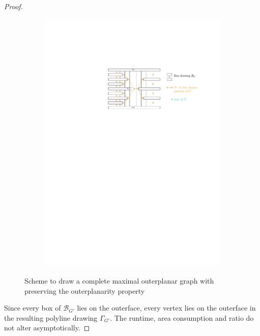 \begin{proof}
\begin{figure}[H]
	\begin{subfigure}{\textwidth}
		\centering
		\includegraphics[page=1,width=\linewidth]{graphics/maximal_outerplanar_preserving_outerplanartiy_scheme.pdf}
	\end{subfigure}
	\caption{Scheme to draw a complete maximal outerplanar graph with preserving the outerplanarity property}\label{im:maximal_outerplanar_preserving_outerplanartiy_scheme}
\end{figure}

Since every box of $\mathcal{B}_{G'}$ lies on the outerface, every vertex lies on the outerface in the resulting polyline drawing $\Gamma_{G'}$. The runtime, area consumption and ratio do not alter asymptotically.
\end{proof}
